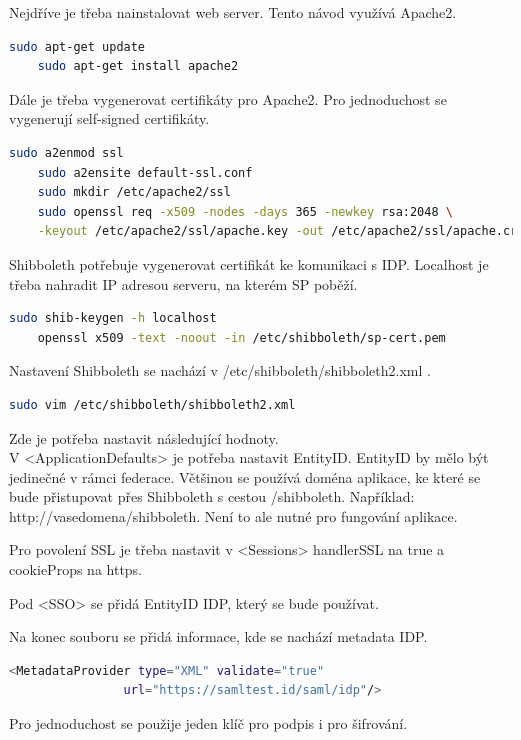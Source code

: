 Nejdříve je třeba nainstalovat web server. Tento návod využívá Apache2.
\begin{lstlisting}[language=Bash]
    sudo apt-get update
    sudo apt-get install apache2
\end{lstlisting}

Dále je třeba vygenerovat certifikáty pro Apache2. Pro jednoduchost se vygenerují self-signed certifikáty.
\begin{lstlisting}[language=Bash]
    sudo a2enmod ssl
    sudo a2ensite default-ssl.conf
    sudo mkdir /etc/apache2/ssl
    sudo openssl req -x509 -nodes -days 365 -newkey rsa:2048 \
    -keyout /etc/apache2/ssl/apache.key -out /etc/apache2/ssl/apache.crt
\end{lstlisting}

Shibboleth potřebuje vygenerovat certifikát ke komunikaci s IDP. Localhost je třeba nahradit IP adresou serveru, na kterém SP poběží.
\begin{lstlisting}[language=Bash]
    sudo shib-keygen -h localhost
    openssl x509 -text -noout -in /etc/shibboleth/sp-cert.pem
\end{lstlisting}

Nastavení Shibboleth se nachází v /etc/shibboleth/shibboleth2.xml .

\begin{lstlisting}[language=Bash]
   sudo vim /etc/shibboleth/shibboleth2.xml
\end{lstlisting}

Zde je potřeba nastavit následující hodnoty. \\V <ApplicationDefaults> je potřeba nastavit EntityID. EntityID by mělo být jedinečné v rámci federace. Většinou se používá doména aplikace, ke které se bude přistupovat přes Shibboleth s cestou /shibboleth. Například: http://vasedomena/shibboleth. Není to ale nutné pro fungování aplikace.

Pro povolení SSL je třeba nastavit v <Sessions>  handlerSSL na true a cookieProps na https.

Pod <SSO> se přidá EntityID IDP, který se bude používat.

Na konec souboru se přidá informace, kde se nachází metadata IDP.
\begin{lstlisting}[language=Bash]
 <MetadataProvider type="XML" validate="true"
                url="https://samltest.id/saml/idp"/>
\end{lstlisting}

Pro jednoduchost se použije jeden klíč pro podpis i pro šifrování.

